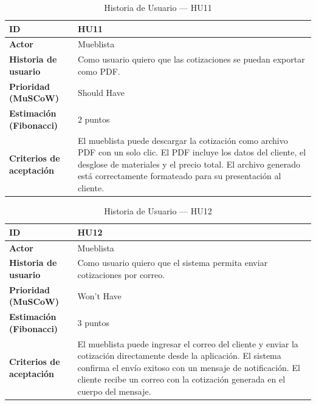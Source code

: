 ﻿\documentclass{iccmemoria}
\begin{document}
\begin{table}[H]
\centering
\caption{Historia de Usuario — HU11}
\begin{tabular}{|p{4.5cm}|p{9.5cm}|}
\hline
\textbf{ID} & HU11 \\
\hline
\textbf{Actor} & Mueblista \\
\hline
\textbf{Historia de usuario} & Como usuario quiero que las cotizaciones se puedan exportar como PDF. \\
\hline
\textbf{Prioridad (MuSCoW)} & Should Have \\
\hline
\textbf{Estimación (Fibonacci)} & 2 puntos \\
\hline
\textbf{Criterios de aceptación} & El mueblista puede descargar la cotización como archivo PDF con un solo clic.\newline
El PDF incluye los datos del cliente, el desglose de materiales y el precio total.\newline
El archivo generado está correctamente formateado para su presentación al cliente. \\
\hline
\end{tabular}
\end{table}

\begin{table}[H]
\centering
\caption{Historia de Usuario — HU12}
\begin{tabular}{|p{4.5cm}|p{9.5cm}|}
\hline
\textbf{ID} & HU12 \\
\hline
\textbf{Actor} & Mueblista \\
\hline
\textbf{Historia de usuario} & Como usuario quiero que el sistema permita enviar cotizaciones por correo. \\
\hline
\textbf{Prioridad (MuSCoW)} & Won't Have \\
\hline
\textbf{Estimación (Fibonacci)} & 3 puntos \\
\hline
\textbf{Criterios de aceptación} & El mueblista puede ingresar el correo del cliente y enviar la cotización directamente desde la aplicación.\newline
El sistema confirma el envío exitoso con un mensaje de notificación.\newline
El cliente recibe un correo con la cotización generada en el cuerpo del mensaje. \\
\hline
\end{tabular}
\end{table}
\end{document}
